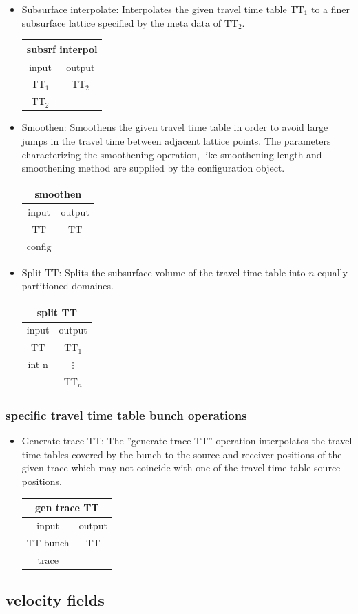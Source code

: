 \documentclass[12pt,a4paper]{article}
\newcommand{\bet}[1]{\begin{center}
		     \begin{tabular}{|c|c|}
		     \hline
		     \multicolumn{2}{|c|}{#1}\\
		     \hline\hline
		     input & output \\
                     \hline}
\newcommand{\eet}{\hline
		  \end{tabular}
		  \end{center}}
\begin{document}
\begin{itemize} 
\item Subsurface interpolate: 
\newline
Interpolates the given travel time table $\mathrm{TT}_1$ to a finer subsurface lattice
specified by the meta data of $\mathrm{TT}_2$.
\bet{subsrf interpol}
$\mathrm{TT}_1$ & $\mathrm{TT}_2$\\
$\mathrm{TT}_2$ & \\
\eet 
\item Smoothen:
\newline
Smoothens the given travel time table in order to avoid large jumps in 
the travel time between adjacent lattice points. The parameters characterizing
the smoothening operation, like smoothening length and smoothening method are
supplied by the configuration object.
\bet{smoothen}
$\mathrm{TT}$ & $\mathrm{TT}$\\
config & \\
\eet

\item Split TT:
\newline
Splits the subsurface volume of the travel time table 
into $n$ equally partitioned domaines.
\bet{split TT}
$\mathrm{TT}$  & $\mathrm{TT}_1$\\
int n          & $\vdots$\\
               & $\mathrm{TT}_n$\\  
\eet

\end{itemize}

\subsubsection{specific travel time table bunch operations}

\begin{itemize}
\item Generate trace TT:
\newline
The ''generate trace TT'' operation interpolates the 
travel time tables covered by the bunch to the source 
and receiver positions of the given trace which may not
coincide with one of the travel time table source positions.

\bet{gen trace TT}
TT bunch & $\mathrm{TT}$\\
$\mathrm{trace}$ & \\ 
\eet
\end{itemize}

\subsection{velocity fields}
\end{document}
